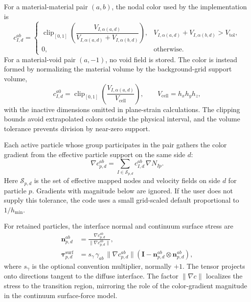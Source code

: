 For a material-material pair $(a,b)$, the nodal color used by the implementation is
\begin{equation}
  c^{ab}_{I,d}=\begin{cases}
  \operatorname{clip}_{[0,1]}
  \left(\dfrac{V_{I,\alpha(a,d)}}{V_{I,\alpha(a,d)}+V_{I,\alpha(b,d)}}\right),
  & V_{I,\alpha(a,d)}+V_{I,\alpha(b,d)}>V_{\mathrm{tol}},\\[1.1em]
  0, & \text{otherwise}.
  \end{cases}
\end{equation}
For a material-void pair $(a,-1)$, no void field is stored.  The color is instead formed by normalizing the material volume by the background-grid support volume,
\begin{equation}
  c^{a0}_{I,d}=\operatorname{clip}_{[0,1]}
  \left(\frac{V_{I,\alpha(a,d)}}{V_{\mathrm{cell}}}\right),
  \qquad
  V_{\mathrm{cell}}=h_x h_y h_z,
\end{equation}
with the inactive dimensions omitted in plane-strain calculations.  The clipping bounds avoid extrapolated colors outside the physical interval, and the volume tolerance prevents division by near-zero support.

Each active particle whose group participates in the pair gathers the color gradient from the effective particle support on the same side $d$:
\begin{equation}
  \nabla c^{ab}_{p,d} =
  \sum_{I\in\mathcal{S}_{p,d}} c^{ab}_{I,d}\,\nabla N_{Ip}.
\end{equation}
Here $\mathcal{S}_{p,d}$ is the set of effective mapped nodes and velocity fields on side $d$ for particle $p$.  Gradients with magnitude below  are ignored.  If the user does not supply this tolerance, the code uses a small grid-scaled default proportional to $1/h_{\min}$.

For retained particles, the interface normal and continuum surface stress are
\begin{align}
  \mathbf{n}_{p,d}^{ab} &=
  \frac{\nabla c^{ab}_{p,d}}{\|\nabla c^{ab}_{p,d}\|}, \\
  \boldsymbol{\tau}^{\mathrm{surf}}_{p,d} &=
  s_{\gamma}\,\gamma_{ab}\,\|\nabla c^{ab}_{p,d}\|
  \left(\mathbf{I}-\mathbf{n}_{p,d}^{ab}\otimes\mathbf{n}_{p,d}^{ab}\right),
\end{align}
where $s_{\gamma}$ is the optional  convention multiplier, normally $+1$.  The tensor projects onto directions tangent to the diffuse interface.  The factor $\|\nabla c\|$ localizes the stress to the transition region, mirroring the role of the color-gradient magnitude in the continuum surface-force model.

